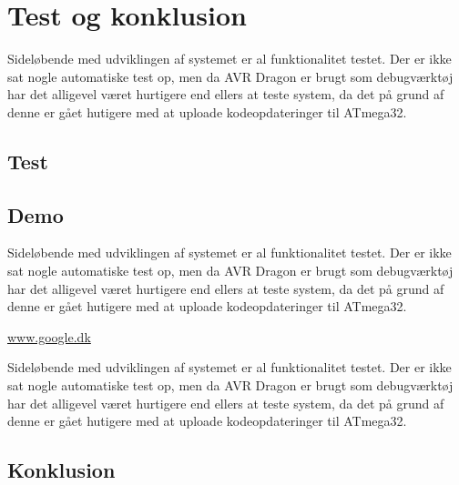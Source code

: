 \section{Test og konklusion}

Sideløbende med udviklingen af systemet er al funktionalitet testet. Der er ikke sat nogle automatiske test op, men da AVR Dragon er brugt som debugværktøj har det alligevel været hurtigere end ellers at teste system, da det på grund af denne er gået hutigere med at uploade kodeopdateringer til ATmega32.

\subsection{Test}


\subsection{Demo}
Sideløbende med udviklingen af systemet er al funktionalitet testet. Der er ikke sat nogle automatiske test op, men da AVR Dragon er brugt som debugværktøj har det alligevel været hurtigere end ellers at teste system, da det på grund af denne er gået hutigere med at uploade kodeopdateringer til ATmega32.

\vskip 0.5cm
	\begin{center}
		\url{www.google.dk}
	\end{center}
\vskip 0.5cm

Sideløbende med udviklingen af systemet er al funktionalitet testet. Der er ikke sat nogle automatiske test op, men da AVR Dragon er brugt som debugværktøj har det alligevel været hurtigere end ellers at teste system, da det på grund af denne er gået hutigere med at uploade kodeopdateringer til ATmega32.

\subsection{Konklusion}

